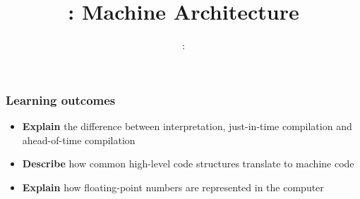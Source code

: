 \usepackage{../../beamerthemeFalmouthGamesAcademy}
\usepackage{multimedia}
\graphicspath{ {../../} }

\usepackage{mips}

\usepackage[normalem]{ulem}
\usepackage{wasysym}

\usepackage{pdfpages}

\usetikzlibrary{arrows,automata}




\title{\sessionnumber: Machine Architecture}
\subtitle{\modulecode: \moduletitle}

\frame{\titlepage} 

\begin{frame}
	\frametitle{Learning outcomes}
	\begin{itemize}
		\item \textbf{Explain} the difference between interpretation, just-in-time compilation and ahead-of-time compilation
		\item \textbf{Describe} how common high-level code structures translate to machine code
		\item \textbf{Explain} how floating-point numbers are represented in the computer
	\end{itemize}
\end{frame}









